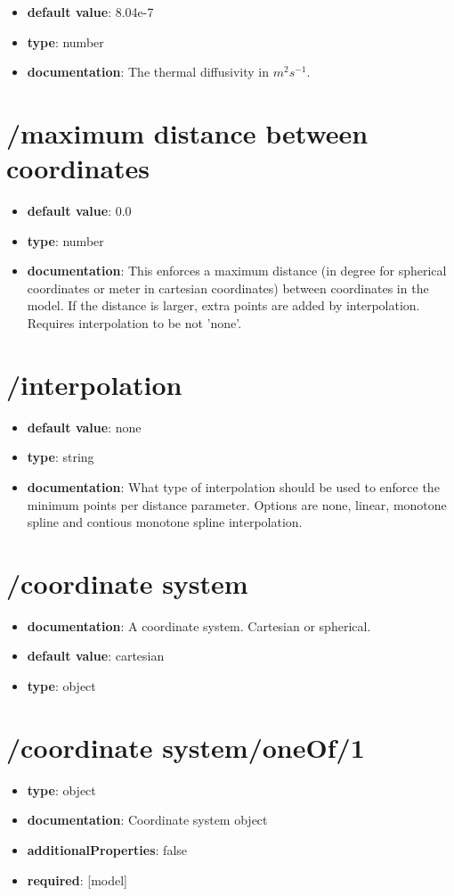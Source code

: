 \begin{itemize}\item {\bf default value}: 8.04e-7
\item {\bf type}: number
\item {\bf documentation}: The thermal diffusivity in $m^{2} s^{-1}$.
\end{itemize}\section{/maximum distance between coordinates}
\begin{itemize}\item {\bf default value}: 0.0
\item {\bf type}: number
\item {\bf documentation}: This enforces a maximum distance (in degree for spherical coordinates or meter in cartesian coordinates) between coordinates in the model. If the distance is larger, extra points are added by interpolation. Requires interpolation to be not 'none'.
\end{itemize}\section{/interpolation}
\begin{itemize}\item {\bf default value}: none
\item {\bf type}: string
\item {\bf documentation}: What type of interpolation should be used to enforce the minimum points per distance parameter. Options are none, linear, monotone spline and contious monotone spline interpolation.
\end{itemize}\section{/coordinate system}
\begin{itemize}\item {\bf documentation}: A coordinate system. Cartesian or spherical.
\item {\bf default value}: cartesian
\item {\bf type}: object
\end{itemize}
\section{/coordinate system/oneOf/1}
\begin{itemize}\item {\bf type}: object
\item {\bf documentation}: Coordinate system object
\item {\bf additionalProperties}: false
\item {\bf required}: [model]\end{itemize}
